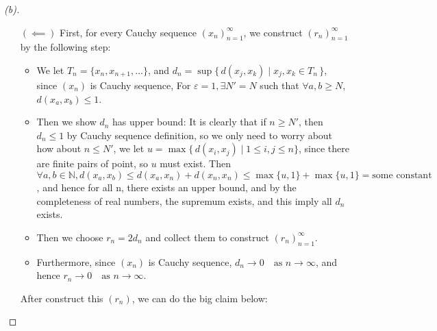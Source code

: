 \begin{proof}[(b)]
\begin{itemize}
        \item [\((\impliedby )\)] 
        First, for every Cauchy sequence $(x_n)_{n=1}^\infty$, we construct $(r_n)_{n=1}^\infty$ by the following step:
        \begin{itemize}
            \item We let $T_n = \{x_n, x_{n+1}, ...\}$, and $d_n = \sup \{\, d(x_j,x_k) \mid x_j,x_k \in T_n \,\}$, since $(x_n)$ is Cauchy sequence, For $\varepsilon = 1, \exists N'=N$ such that $\forall a,b \geq N$, $d(x_a, x_b) \leq 1$.
            \item Then we show $d_n$ has upper bound: It is clearly that if $n \geq N'$, then $d_n \leq 1$ by Cauchy sequence definition, so we only need to worry about how about $n \leq N'$, we let $u = \max \{\, d(x_i,x_j) \mid 1\leq i,j \leq n\}$, since there are finite pairs of point, so $u$ must exist. Then 
            \[
            \forall a, b \in \mathbb{N}, d(x_a, x_b) \leq d(x_a, x_n) + d(x_n, x_n) \leq \max\{u, 1\} + \max\{u, 1\} = \text{some constant}
            \]
            , and hence for all n, there exists an upper bound, and by the completeness of real numbers, the supremum exists, and this imply all $d_n$ exists.
            \item Then we choose $r_n = 2d_n$ and collect them to construct $(r_n)_{n=1}^\infty$.
            \item Furthermore, since $(x_n)$ is Cauchy sequence, $d_n \to 0 \quad\text{as } n\to\infty$, and hence $r_n \to 0 \quad\text{as } n\to\infty$.           
        \end{itemize}

        After construct this $(r_n)$, we can do the big claim below:
        

\end{itemize}
\end{proof}

